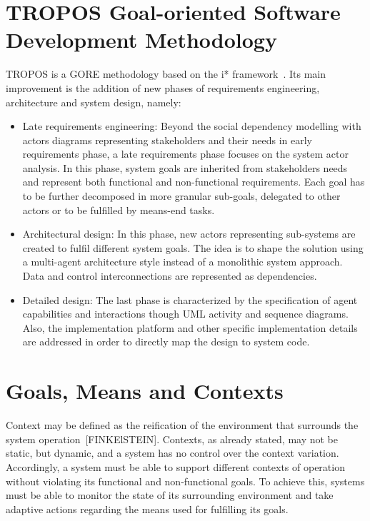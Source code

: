\section{TROPOS Goal-oriented Software Development Methodology}

TROPOS is a GORE methodology based on the i* framework~\cite{Bresciani:2004}. Its main improvement is the addition of new phases of requirements engineering, architecture and system design, namely:

\begin{itemize}

\item Late requirements engineering: Beyond the social dependency modelling with actors diagrams representing stakeholders and their needs in early requirements phase, a late requirements phase focuses on the system actor analysis. In this phase, system goals are inherited from stakeholders needs and represent both functional and non-functional requirements. Each goal has to be further decomposed in more granular sub-goals, delegated to other actors or to be fulfilled by means-end tasks. 
\medskip

\item Architectural design: In this phase, new actors representing sub-systems are created to fulfil different system goals. The idea is to shape the solution using a multi-agent architecture style instead of a monolithic system approach. Data and control interconnections are represented as dependencies.
\medskip

\item Detailed design: The last phase is characterized by the specification of agent capabilities and interactions though UML activity and sequence diagrams. Also, the implementation platform and other specific implementation details are addressed in order to directly map the design to system code.

\end{itemize}


\section{Goals, Means and Contexts}

Context may be defined as the reification of the environment that surrounds the system operation~[FINKElSTEIN]. Contexts, as already stated, may not be static, but dynamic, and a system has no control over the context variation. Accordingly, a system must be able to support different contexts of operation without violating its functional and non-functional goals. To achieve this, systems must be able to monitor the state of its surrounding environment and take adaptive actions regarding the means used for fulfilling its goals.

